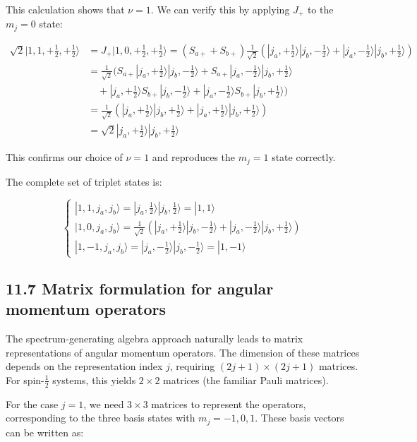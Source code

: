 \documentclass[10pt]{article}
\begin{document}
This calculation shows that $\nu=1$. We can verify this by applying $J_+$ to the $m_j=0$ state:

\begin{align*}
\sqrt{2}|1,1,+\frac{1}{2},+\frac{1}{2}\rangle &= J_{+}|1,0,+\frac{1}{2},+\frac{1}{2}\rangle=(S_{a+}+S_{b+})\frac{1}{\sqrt{2}}(|j_a,+\frac{1}{2}\rangle|j_b,-\frac{1}{2}\rangle+|j_a,-\frac{1}{2}\rangle|j_b,+\frac{1}{2}\rangle) \\
&= \frac{1}{\sqrt{2}}(S_{a+}|j_a,+\frac{1}{2}\rangle|j_b,-\frac{1}{2}\rangle+S_{a+}|j_a,-\frac{1}{2}\rangle|j_b,+\frac{1}{2}\rangle \\
&\quad +|j_a,+\frac{1}{2}\rangle S_{b+}|j_b,-\frac{1}{2}\rangle+|j_a,-\frac{1}{2}\rangle S_{b+}|j_b,+\frac{1}{2}\rangle) \\
&= \frac{1}{\sqrt{2}}(|j_a,+\frac{1}{2}\rangle|j_b,+\frac{1}{2}\rangle+|j_a,+\frac{1}{2}\rangle|j_b,+\frac{1}{2}\rangle) \\
&= \sqrt{2}|j_a,+\frac{1}{2}\rangle|j_b,+\frac{1}{2}\rangle \tag{11.67}
\end{align*}

This confirms our choice of $\nu=1$ and reproduces the $m_j=1$ state correctly.

The complete set of triplet states is:

\[
\left\{\begin{array}{l}
|1,1,j_a,j_b\rangle=|j_a,\frac{1}{2}\rangle|j_b,\frac{1}{2}\rangle=|1,1\rangle  \tag{11.68}\\
|1,0,j_a,j_b\rangle=\frac{1}{\sqrt{2}}(|j_a,+\frac{1}{2}\rangle|j_b,-\frac{1}{2}\rangle+|j_a,-\frac{1}{2}\rangle|j_b,+\frac{1}{2}\rangle) \\
|1,-1,j_a,j_b\rangle=|j_a,-\frac{1}{2}\rangle|j_b,-\frac{1}{2}\rangle=|1,-1\rangle
\end{array}\right.
\]


\subsection*{11.7 Matrix formulation for angular momentum operators}
The spectrum-generating algebra approach naturally leads to matrix representations of angular momentum operators. The dimension of these matrices depends on the representation index $j$, requiring $(2j+1)\times(2j+1)$ matrices. For spin-$\frac{1}{2}$ systems, this yields $2\times2$ matrices (the familiar Pauli matrices).

For the case $j=1$, we need $3\times3$ matrices to represent the operators, corresponding to the three basis states with $m_j=-1,0,1$. These basis vectors can be written as:
\end{document}
